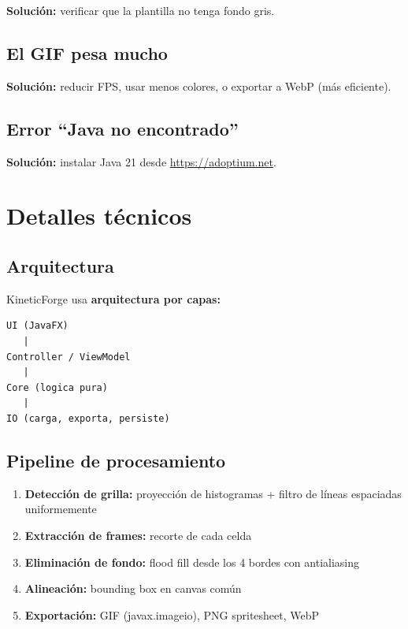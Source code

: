 \documentclass[12pt,a4paper]{article}
\begin{document}
\textbf{Solución:} verificar que la plantilla no tenga fondo gris.

\subsection{El GIF pesa mucho}

\textbf{Solución:} reducir FPS, usar menos colores, o exportar a WebP (más eficiente).

\subsection{Error ``Java no encontrado''}

\textbf{Solución:} instalar Java 21 desde \url{https://adoptium.net}.

\section{Detalles técnicos}

\subsection{Arquitectura}

KineticForge usa \textbf{arquitectura por capas:}

\begin{verbatim}
UI (JavaFX)
   |
Controller / ViewModel
   |
Core (logica pura)
   |
IO (carga, exporta, persiste)
\end{verbatim}

\subsection{Pipeline de procesamiento}

\begin{enumerate}[leftmargin=*]
    \item \textbf{Detección de grilla:} proyección de histogramas + filtro de líneas espaciadas uniformemente
    \item \textbf{Extracción de frames:} recorte de cada celda
    \item \textbf{Eliminación de fondo:} flood fill desde los 4 bordes con antialiasing
    \item \textbf{Alineación:} bounding box en canvas común
    \item \textbf{Exportación:} GIF (javax.imageio), PNG spritesheet, WebP
\end{enumerate}
\end{document}
